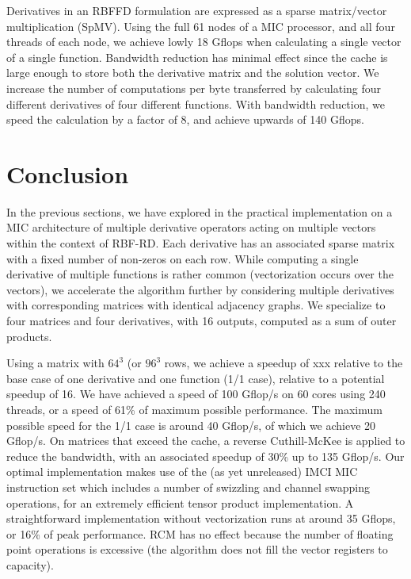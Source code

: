 \documentclass[10pt,conference,compsocconf]{IEEEtran}
\newcommand{\todo}[1]{{\color{red}\textbf{\hl{#1}}\xspace}}
\begin{document}
Derivatives in an RBFFD formulation are expressed as a sparse
matrix/vector multiplication (SpMV). Using the full 61 nodes of a MIC
processor, and all four threads of each node, we achieve lowly 18
Gflops when calculating a single vector of a single
function. Bandwidth reduction has minimal effect since the cache is
large enough to store both the derivative matrix and the solution
vector. We increase the number of computations per byte transferred by
calculating four different derivatives of four different
functions. With bandwidth reduction, we speed the calculation by a
factor of 8, and achieve upwards of 140 Gflops.


\section{Conclusion}
\label{sec:ccl}

In the previous sections, we have explored in the practical
implementation on a MIC architecture of multiple derivative operators
acting on multiple vectors within the context of RBF-RD. Each
derivative has an associated sparse matrix with a fixed number of
non-zeros on each row. While computing a single derivative of multiple
functions is rather common (vectorization occurs over the vectors), we
accelerate the algorithm further by considering multiple derivatives
with corresponding matrices with identical adjacency graphs. We
specialize to four matrices and four derivatives, with 16 outputs,
computed as a sum of outer products.

Using a matrix with $64^3$ (or $96^3$ rows, we achieve a speedup of
xxx relative to the base case of one derivative and one function (1/1
case), relative to a potential speedup of 16. We have achieved a
speed of 100 Gflop/s on 60 cores using 240 threads, or a speed of 61\% of
maximum possible performance. The maximum possible speed for the 1/1
case is around 40 Gflop/s, of which we achieve 20 Gflop/s. On matrices
that exceed the cache, a reverse Cuthill-McKee is applied to reduce the
bandwidth, with an associated speedup of 30\% up to 135 Gflop/s. Our
optimal implementation makes use of the (as yet unreleased) IMCI MIC instruction set 
which includes a number of swizzling and channel swapping operations, for an
extremely efficient tensor product implementation. A straightforward
implementation without vectorization runs at around 35 Gflops, or 16\% of peak
performance. RCM has no effect because the number of floating point
operations is excessive (the algorithm does not fill the vector
registers to capacity).
\end{document}
